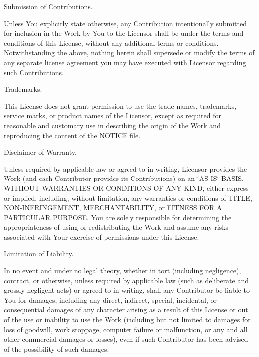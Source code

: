 \begin{DoxyEnumerate}
\item Submission of Contributions.
\end{DoxyEnumerate}

Unless You explicitly state otherwise, any Contribution intentionally submitted for inclusion in the Work by You to the Licensor shall be under the terms and conditions of this License, without any additional terms or conditions. Notwithstanding the above, nothing herein shall supersede or modify the terms of any separate license agreement you may have executed with Licensor regarding such Contributions.


\begin{DoxyEnumerate}
\item Trademarks.
\end{DoxyEnumerate}

This License does not grant permission to use the trade names, trademarks, service marks, or product names of the Licensor, except as required for reasonable and customary use in describing the origin of the Work and reproducing the content of the N\+O\+T\+I\+CE file.


\begin{DoxyEnumerate}
\item Disclaimer of Warranty.
\end{DoxyEnumerate}

Unless required by applicable law or agreed to in writing, Licensor provides the Work (and each Contributor provides its Contributions) on an \char`\"{}\+A\+S I\+S\char`\"{} B\+A\+S\+IS, W\+I\+T\+H\+O\+UT W\+A\+R\+R\+A\+N\+T\+I\+ES OR C\+O\+N\+D\+I\+T\+I\+O\+NS OF A\+NY K\+I\+ND, either express or implied, including, without limitation, any warranties or conditions of T\+I\+T\+LE, N\+O\+N-\/\+I\+N\+F\+R\+I\+N\+G\+E\+M\+E\+NT, M\+E\+R\+C\+H\+A\+N\+T\+A\+B\+I\+L\+I\+TY, or F\+I\+T\+N\+E\+SS F\+OR A P\+A\+R\+T\+I\+C\+U\+L\+AR P\+U\+R\+P\+O\+SE. You are solely responsible for determining the appropriateness of using or redistributing the Work and assume any risks associated with Your exercise of permissions under this License.


\begin{DoxyEnumerate}
\item Limitation of Liability.
\end{DoxyEnumerate}

In no event and under no legal theory, whether in tort (including negligence), contract, or otherwise, unless required by applicable law (such as deliberate and grossly negligent acts) or agreed to in writing, shall any Contributor be liable to You for damages, including any direct, indirect, special, incidental, or consequential damages of any character arising as a result of this License or out of the use or inability to use the Work (including but not limited to damages for loss of goodwill, work stoppage, computer failure or malfunction, or any and all other commercial damages or losses), even if such Contributor has been advised of the possibility of such damages.


